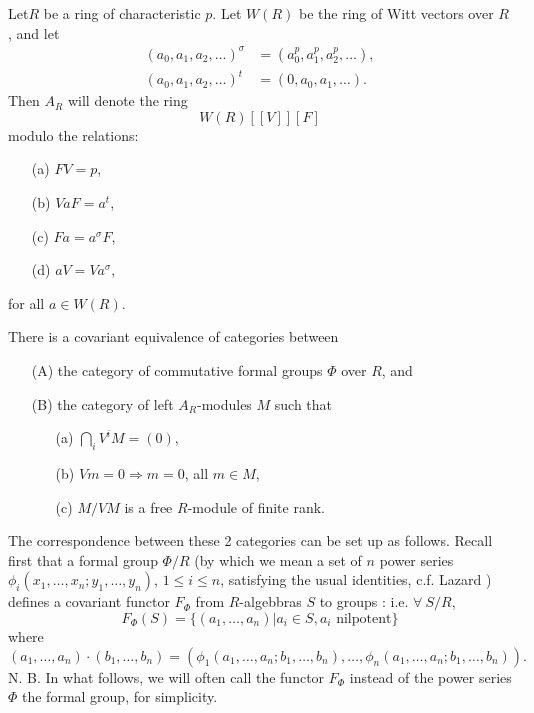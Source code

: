 \begin{defi*}
Let\pageoriginale $R$ be a ring of characteristic $p$. Let $W(R)$ be the ring of Witt vectors over $R$, and let
\begin{align*}
(a_{0},a_{1},a_{2},\ldots)^{\sigma} &= (a^{p}_{0},a^{p}_{1},a^{p}_{2},\ldots),\\[3pt]
(a_{0},a_{1},a_{2},\ldots)^{t} &= (0,a_{0},a_{1},\ldots). 
\end{align*}
Then $A_{R}$ will denote the ring
$$
W(R)[[V]][F]
$$
modulo the relations:
\begin{itemize}
\item[{\rm(a)}] $FV=p$,

\item[{\rm(b)}] $VaF=a^{t}$,

\item[{\rm(c)}] $Fa=a^{\sigma}F$,

\item[{\rm(d)}] $aV=Va^{\sigma}$,
\end{itemize}
for all $a\in W(R)$.
\end{defi*}

\begin{theorem*}
There is a covariant equivalence of categories between
\begin{itemize}
\item[{\rm(A)}] the category of commutative formal groups $\Phi$ over $R$, and

\item[{\rm(B)}] the category of left $A_{R}$-modules $M$ such that
\begin{itemize}
\item[{\rm(a)}] $\bigcap\limits_{i}V^{i}M=(0)$,

\item[{\rm(b)}] $Vm=0\Rightarrow m=0$, all $m\in M$,

\item[{\rm(c)}] $M/VM$ is a free $R$-module of finite rank.
\end{itemize}
\end{itemize}
\end{theorem*}

The correspondence between these 2 categories can be set up as follows. Recall first that a formal group $\Phi/R$ (by which we mean a set of $n$ power series $\phi_{i}(x_{1},\ldots,x_{n};y_{1},\ldots,y_{n})$, $1\leq i\leq n$, satisfying the usual identities, c.f. Lazard \cite{art15-key3}) defines a covariant functor $F_{\Phi}$ from $R$-algebbras $S$ to groups : i.e. $\forall \ S/R$,
$$
F_{\Phi}(S)=\{(a_{1},\ldots,a_{n})|a_{i}\in S, a_{i}\text{~nilpotent}\}
$$
where
$$
(a_{1},\ldots,a_{n})\cdot (b_{1},\ldots,b_{n})=(\phi_{1}(a_{1},\ldots,a_{n};b_{1},\ldots,b_{n}),\ldots,\phi_{n}(a_{1},\ldots,a_{n};b_{1},\ldots,b_{n})).
$$
N. B. In what follows, we will often call the functor $F_{\Phi}$ instead of the power series $\Phi$ the formal group, for simplicity.

